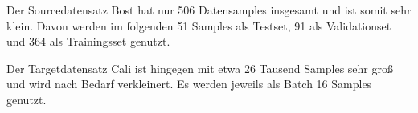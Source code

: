 Der Sourcedatensatz Bost hat nur 506 Datensamples insgesamt und ist somit sehr klein. 
Davon werden im folgenden 51 Samples als Testset, 91 als Validationset und 364 als Trainingsset genutzt. 

Der Targetdatensatz Cali ist hingegen mit etwa 26 Tausend Samples sehr groß und wird nach Bedarf verkleinert. 
Es werden jeweils als Batch 16 Samples genutzt. 
